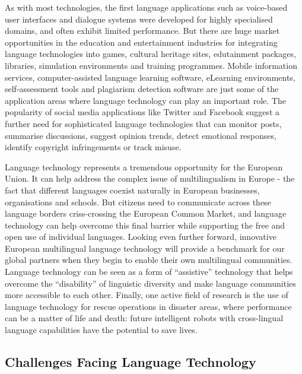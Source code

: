 \documentclass[]{../../metanetpaper}
\begin{document}
\begin{multicols}{2}
As with most technologies, the first language applications such as voice-based
user interfaces and dialogue systems were developed for highly specialised
domains, and often exhibit limited performance. But there are huge market
opportunities in the education and entertainment industries for integrating
language technologies into games, cultural heritage sites, edutainment
packages, libraries, simulation environments and training programmes. Mobile
information services, computer-assisted language learning software, eLearning
environments, self-assessment tools and plagiarism detection software are just
some of the application areas where language technology can play an important
role. The popularity of social media applications like Twitter and Facebook
suggest a further need for sophisticated language technologies that can
monitor posts, summarise discussions, suggest opinion trends, detect emotional
responses, identify copyright infringements or track misuse.


Language technology represents a tremendous opportunity for the European
Union. It can help address the complex issue of multilingualism in Europe -
the fact that different languages coexist naturally in European businesses,
organisations and schools. But citizens need to communicate across these
language borders criss-crossing the European Common Market, and language
technology can help overcome this final barrier while supporting the free and
open use of individual languages. Looking even further forward, innovative
European multilingual language technology will provide a benchmark for our
global partners when they begin to enable their own multilingual
communities. Language technology can be seen as a form of “assistive”
technology that helps overcome the “disability” of linguistic diversity and
make language communities more accessible to each other. Finally, one active
field of research is the use of language technology for rescue operations in
disaster areas, where performance can be a matter of life and death: future
intelligent robots with cross-lingual language capabilities have the potential
to save lives.

\subsection{Challenges Facing Language Technology}


\end{multicols}
\end{document}

